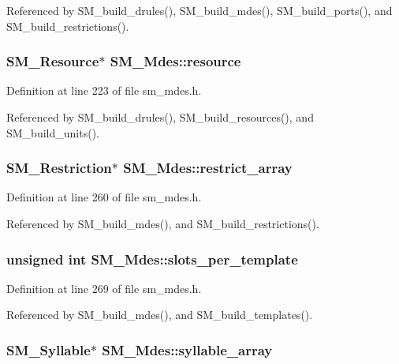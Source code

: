 Referenced by SM\_\-build\_\-drules(), SM\_\-build\_\-mdes(), SM\_\-build\_\-ports(), and SM\_\-build\_\-restrictions().
\subsubsection{\setlength{\rightskip}{0pt plus 5cm}\bf{SM\_\-Resource}$\ast$ \bf{SM\_\-Mdes::resource}}\label{structSM__Mdes_8992583ede08e603ba43c64da275e4a2}




Definition at line 223 of file sm\_\-mdes.h.

Referenced by SM\_\-build\_\-drules(), SM\_\-build\_\-resources(), and SM\_\-build\_\-units().
\subsubsection{\setlength{\rightskip}{0pt plus 5cm}\bf{SM\_\-Restriction}$\ast$ \bf{SM\_\-Mdes::restrict\_\-array}}\label{structSM__Mdes_1450bbb18bdafc7038305d5592527d81}




Definition at line 260 of file sm\_\-mdes.h.

Referenced by SM\_\-build\_\-mdes(), and SM\_\-build\_\-restrictions().
\subsubsection{\setlength{\rightskip}{0pt plus 5cm}unsigned int \bf{SM\_\-Mdes::slots\_\-per\_\-template}}\label{structSM__Mdes_87a430ba0793a8df58ba1e9b7716c60f}




Definition at line 269 of file sm\_\-mdes.h.

Referenced by SM\_\-build\_\-mdes(), and SM\_\-build\_\-templates().
\subsubsection{\setlength{\rightskip}{0pt plus 5cm}\bf{SM\_\-Syllable}$\ast$ \bf{SM\_\-Mdes::syllable\_\-array}}\label{structSM__Mdes_35f9126db356ee337503587658e9b479}




